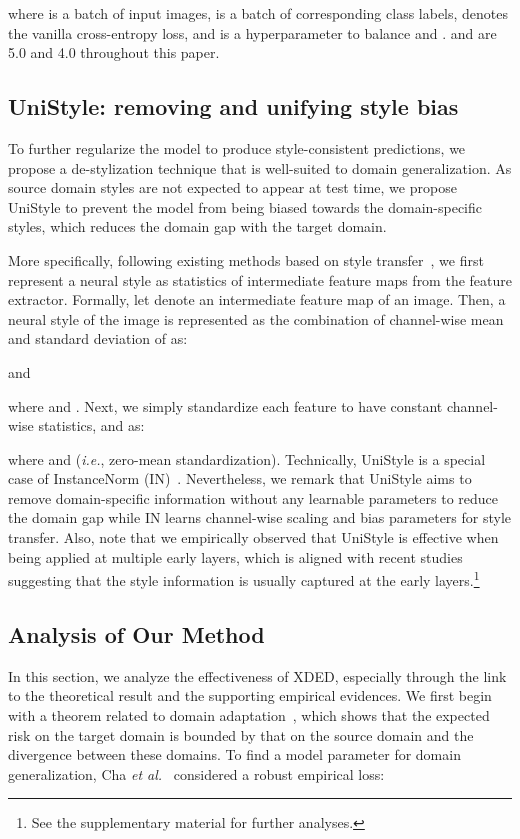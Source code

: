 \documentclass[runningheads]{llncs}
\def\ie{\emph{i.e.}}
\def\etal{\emph{et al.}}
\begin{document}
where  is a batch of input images,  is a batch of corresponding class labels,  denotes the vanilla cross-entropy loss, and  is a hyperparameter to balance  and .  and  are 5.0 and 4.0 throughout this paper.

\subsection{UniStyle: removing and unifying style bias} To further regularize the model to produce style-consistent predictions, we propose a de-stylization technique that is well-suited to domain generalization. As source domain styles are not expected to appear at test time, we propose UniStyle to prevent the model from being biased towards the domain-specific styles, which reduces the domain gap with the target domain.

More specifically, following existing methods based on style transfer~\cite{dumoulin2016learned,huang2017arbitrary,ulyanov2016instance}, we first represent a neural style as statistics of intermediate feature maps from the feature extractor. Formally, let  denote an  intermediate feature map of an image. Then, a neural style of the image is represented as the combination of channel-wise mean  and standard deviation  of  as:

and

where  and . Next, we simply standardize each feature to have constant channel-wise statistics,  and  as:

where  and  (\ie, zero-mean standardization). 
Technically, UniStyle is a special case of InstanceNorm (IN)~\cite{ulyanov2016instance}. Nevertheless, we remark that UniStyle aims to remove domain-specific information without any learnable parameters to reduce the domain gap while IN learns channel-wise scaling and bias parameters for style transfer.
Also, note that we empirically observed that UniStyle is effective when being applied at multiple early layers, which is aligned with recent studies~\cite{dumoulin2016learned,huang2017arbitrary} suggesting that the style information is usually captured at the early layers.\footnote{See the supplementary material for further analyses.}



\subsection{Analysis of Our Method}
In this section, we analyze the effectiveness of XDED, especially through the link to the theoretical result and the supporting empirical evidences. We first begin with a theorem related to domain adaptation~\cite{ben2010theory,ben2007analysis}, which shows that the expected risk on the target domain is bounded by that on the source domain and the divergence between these domains.
To find a model parameter  for domain generalization, Cha \etal~\cite{cha2021swad} considered a robust empirical loss:
\end{document}
